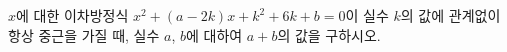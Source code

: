 $x$에 대한 이차방정식 $x^2+(a-2k)x+k^2+6k+b=0$이 실수 $k$의 값에 관계없이 항상 중근을 가질 때, 실수 $a$, $b$에 대하여 $a+b$의 값을 구하시오.
